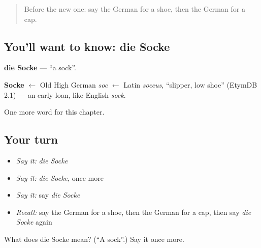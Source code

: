 \begin{quote}
Before the new one: say the German for a shoe, then the German for a cap.
\end{quote}

\subsection*{You'll want to know: die Socke}
\textbf{die Socke} — \textquotedblleft{}a sock\textquotedblright{}.

\begin{cousinweb}
\textbf{Socke} $\leftarrow$ Old High German \emph{soc} $\leftarrow$ Latin \emph{soccus}, \textquotedblleft{}slipper, low shoe\textquotedblright{} (EtymDB 2.1) — an early loan, like English \emph{sock}.
\end{cousinweb}

\begin{grammarlens}[title={What you've built}]
One more word for this chapter.
\end{grammarlens}

\subsection*{Your turn}
\begin{itemize}
\raggedright
  \item \emph{Say it:} \emph{die Socke}
  \item \emph{Say it:} \emph{die Socke}, once more
  \item \emph{Say it:} say \emph{die Socke}
  \item \emph{Recall:} say the German for a shoe, then the German for a cap, then say \emph{die Socke} again
\end{itemize}

\begin{tcolorbox}[breakable,colback=teal!4,colframe=teal!35!black,title={Before you move on}]
What does die Socke mean? (\textquotedblleft{}A sock\textquotedblright{}.) Say it once more.
\end{tcolorbox}
